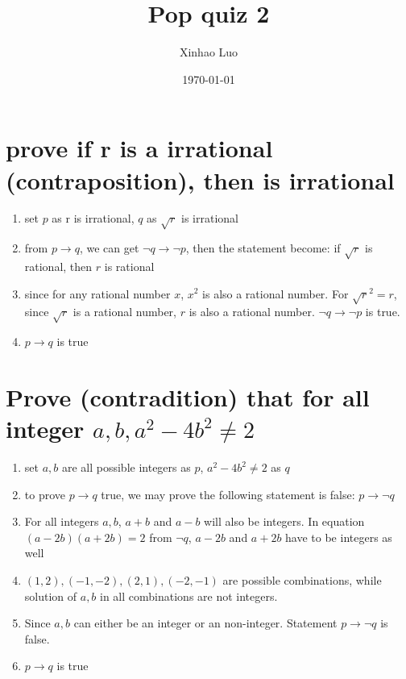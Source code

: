 \documentclass{article}
\title{\bf \Large Pop quiz 2}
\author{Xinhao Luo}
\date{\today}
\def\math#1{$#1$}
\begin{document}
\maketitle
\medskip

\section{prove if r is a irrational (contraposition), then  is irrational}

\begin{enumerate}
    \item set \math{p} as r is irrational, \math{q} as \math{\sqrt{r}} is irrational
    \item from \math{p \to q}, we can get \math{\neg q \to \neg p}, then the statement become: if \math{\sqrt{r}} is rational, then \math{r} is rational
    \item since for any rational number \math{x}, \math{{x}^2} is also a rational number. For \math{{\sqrt{r}}^2 = r}, since \math{\sqrt{r}} is a rational number, \math{r} is also a rational number. \math{\neg q \to \neg p} is true.
    \item \math{p \to q} is true
\end{enumerate}

\section{Prove (contradition) that for all integer \math{a, b, a^2-4b^2 \neq 2}}

\begin{enumerate}
    \item set \math{a, b} are all possible integers as \math{p}, \math{{a}^2 - {4b}^2 \neq 2} as \math{q}
    \item to prove \math{p \to q} true, we may prove the following statement is false: \math{p \to \neg q}
    \item For all integers \math{a, b}, \math{a + b} and \math{a - b} will also be integers. In equation \math{(a-2b)(a+2b) = 2} from \math{\neg q}, \math{a-2b} and \math{a+2b} have to be integers as well
    \item \math{(1, 2), (-1, -2), (2, 1), (-2, -1)} are possible combinations, while solution of \math{a, b} in all combinations are not integers. 
    \item Since \math{a, b} can either be an integer or an non-integer. Statement \math{p \to \neg q} is false.
    \item \math{p \to q} is true
\end{enumerate}
\end{document}
